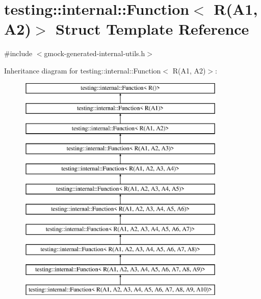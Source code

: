 \hypertarget{structtesting_1_1internal_1_1_function_3_01_r_07_a1_00_01_a2_08_4}{}\section{testing\+::internal\+::Function$<$ R(A1, A2)$>$ Struct Template Reference}
\label{structtesting_1_1internal_1_1_function_3_01_r_07_a1_00_01_a2_08_4}


{\ttfamily \#include $<$gmock-\/generated-\/internal-\/utils.\+h$>$}

Inheritance diagram for testing\+::internal\+::Function$<$ R(A1, A2)$>$\+:\begin{figure}[H]
\begin{center}
\leavevmode
\includegraphics[height=11.000000cm]{de/dfa/structtesting_1_1internal_1_1_function_3_01_r_07_a1_00_01_a2_08_4}
\end{center}
\end{figure}
